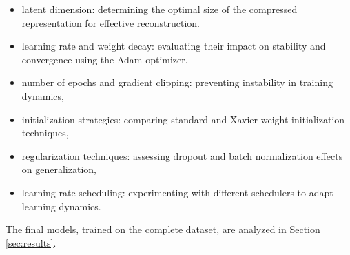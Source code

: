 \begin{itemize}
\item latent dimension: determining the optimal size of the compressed representation for effective reconstruction.
\item learning rate and weight decay: evaluating their impact on stability and convergence using the Adam optimizer.
\item number of epochs and gradient clipping: preventing instability in training dynamics,
\item initialization strategies: comparing standard and Xavier weight initialization techniques,
\item regularization techniques: assessing dropout and batch normalization effects on generalization,
\item learning rate scheduling: experimenting with different schedulers to adapt learning dynamics.
\end{itemize}

The final models, trained on the complete dataset, are analyzed in Section \ref{sec:results}.
